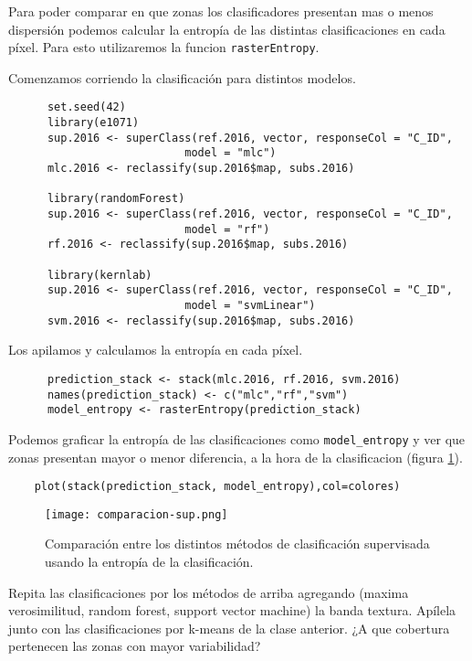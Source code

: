 Para poder comparar en que zonas los clasificadores presentan mas o menos dispersi\'on podemos calcular la entrop\'ia de las distintas clasificaciones en cada p\'ixel. Para esto utilizaremos la funcion \texttt{rasterEntropy}.

\begin{exa}
  Comenzamos corriendo la clasificaci\'on para distintos modelos.

  \begin{lstlisting}
      set.seed(42)
      library(e1071)
      sup.2016 <- superClass(ref.2016, vector, responseCol = "C_ID",
                           model = "mlc")
      mlc.2016 <- reclassify(sup.2016$map, subs.2016)

      library(randomForest)
      sup.2016 <- superClass(ref.2016, vector, responseCol = "C_ID",
                           model = "rf")
      rf.2016 <- reclassify(sup.2016$map, subs.2016)

      library(kernlab)
      sup.2016 <- superClass(ref.2016, vector, responseCol = "C_ID",
                           model = "svmLinear")
      svm.2016 <- reclassify(sup.2016$map, subs.2016)
  \end{lstlisting}

  Los apilamos y calculamos la entrop\'ia en cada p\'ixel.

  \begin{lstlisting}
      prediction_stack <- stack(mlc.2016, rf.2016, svm.2016)
      names(prediction_stack) <- c("mlc","rf","svm")
      model_entropy <- rasterEntropy(prediction_stack)
  \end{lstlisting}

  Podemos graficar la entrop\'ia de las clasificaciones como \verb|model_entropy| y ver que zonas presentan mayor o menor diferencia, a la hora de la clasificacion (figura \ref{fig:entropia}).

  \begin{lstlisting}
    plot(stack(prediction_stack, model_entropy),col=colores)
  \end{lstlisting}

  \begin{figure}[h!]
    \centering
    \texttt{[image: comparacion-sup.png]}
    \caption{Comparaci\'on entre los distintos m\'etodos de clasificaci\'on supervisada usando la entrop\'ia de la clasificaci\'on.}
    \label{fig:entropia}
  \end{figure}

\end{exa}

\begin{act}
  Repita las clasificaciones por los m\'etodos de arriba agregando (maxima verosimilitud, random forest, support vector machine) la banda textura. Ap\'ilela junto con las clasificaciones por k-means de la clase anterior. ¿A que cobertura pertenecen las zonas con mayor variabilidad?
\end{act}
